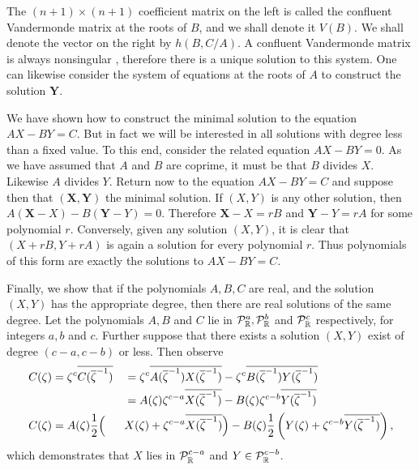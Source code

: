 \documentclass{article}
\begin{document}
The $(n+1)\times (n+1)$ coefficient matrix on the left is called the confluent Vandermonde matrix at the roots of $B$, and we shall denote it $V(B)$. We shall denote the vector on the right by $h(B,C/A)$. A confluent Vandermonde matrix is always nonsingular \cite{Kalman1984}, therefore there is a unique solution to this system. One can likewise consider the system of equations at the roots of $A$ to construct the solution $\mathbf{Y}$.

We have shown how to construct the minimal solution to the equation $AX - BY = C$. But in fact we will be interested in all solutions with degree less than a fixed value. To this end, consider the related equation $AX-BY = 0$. As we have assumed that $A$ and $B$ are coprime, it must be that $B$ divides $X$. Likewise $A$ divides $Y$. Return now to the equation $AX-BY=C$ and suppose then that $(\mathbf{X},\mathbf{Y})$ the minimal solution. If $(X,Y)$ is any other solution, then $A(\mathbf{X}-X) - B(\mathbf{Y}-Y) = 0$. Therefore $\mathbf{X}-X = r B$ and $\mathbf{Y}-Y = rA$ for some polynomial $r$. Conversely, given any solution $(X,Y)$, it is clear that $(X+rB,Y+rA)$ is again a solution for every polynomial $r$. Thus polynomials of this form are exactly the solutions to $AX-BY=C$.

Finally, we show that if the polynomials $A,B,C$ are real, and the solution $(X,Y)$ has the appropriate degree, then there are real solutions of the same degree. Let the polynomials $A,B$ and $C$ lie in $\mathcal{P}^a_{\mathbb{R}}, \mathcal{P}^b_{\mathbb{R}}$ and $\mathcal{P}^c_{\mathbb{R}}$ respectively, for integers $a,b$ and $c$. Further suppose that there exists a solution $(X,Y)$ exist of degree $(c-a,c-b)$ or less. Then observe
\begin{alignat*}{3}
C(\zeta) &= \zeta^c \overline{ C(\overline{\zeta}^{-1})}
&&= \zeta^{c}\overline{A(\overline{\zeta}^{-1})} \overline{X(\overline{\zeta}^{-1})} - \zeta^{c}\overline{B(\overline{\zeta}^{-1})} \overline{Y(\overline{\zeta}^{-1})} \\
&&&= A(\zeta) \zeta^{c-a}\overline{X(\overline{\zeta}^{-1})} - B(\zeta) \zeta^{c-b}\overline{Y(\overline{\zeta}^{-1})} \\
C(\zeta)
&= A(\zeta) \frac{1}{2}\Big( &&X(\zeta) + \zeta^{c-a}\overline{X(\overline{\zeta}^{-1})}\Big) - B(\zeta) \frac{1}{2}\left( Y(\zeta) + \zeta^{c-b}\overline{Y(\overline{\zeta}^{-1})}\right) ,
\end{alignat*}
which demonstrates that $X$ lies in $\mathcal{P}^{c-a}_{\mathbb{R}}$ and $Y\in \mathcal{P}^{c-b}_{\mathbb{R}}$.
\end{document}

